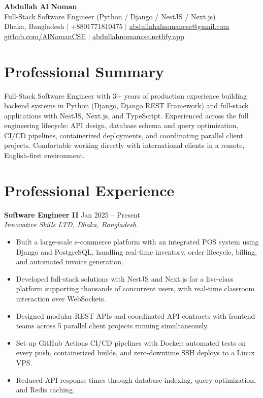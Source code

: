 \documentclass[11pt,a4paper]{article}
\newcommand{\resumeItem}[1]{\item[--] #1}
\newenvironment{resumeList}{\begin{itemize}[leftmargin=1.1em,itemsep=1pt,parsep=0pt,topsep=2pt]}{\end{itemize}}
\newcommand{\resumeEntry}[4]{
  \noindent\textbf{#1} \hfill #2 \\
  \textit{#3} \hfill \textit{#4}
}
\begin{document}
\begin{center}
    {\LARGE \textbf{Abdullah Al Noman}}\\[2pt]
    {\large Full-Stack Software Engineer (Python / Django / NestJS / Next.js)}\\[4pt]
    Dhaka, Bangladesh $\vert$ +8801771810475 $\vert$ \href{mailto:abdullahalnomancse@gmail.com}{abdullahalnomancse@gmail.com}\\
    \href{https://github.com/AlNomanCSE}{github.com/AlNomanCSE} $\vert$
    \href{https://abdullahnomancse.netlify.app}{abdullahnomancse.netlify.app}
\end{center}

\section*{Professional Summary}
Full-Stack Software Engineer with 3+ years of production experience building backend systems in Python (Django, Django REST Framework) and full-stack applications with NestJS, Next.js, and TypeScript. Experienced across the full engineering lifecycle: API design, database schema and query optimization, CI/CD pipelines, containerized deployments, and coordinating parallel client projects. Comfortable working directly with international clients in a remote, English-first environment.

\section*{Professional Experience}

\resumeEntry{Software Engineer II}{Jan 2025 -- Present}{Innovative Skills LTD, Dhaka, Bangladesh}{}
\begin{resumeList}
    \resumeItem{Built a large-scale e-commerce platform with an integrated POS system using Django and PostgreSQL, handling real-time inventory, order lifecycle, billing, and automated invoice generation.}
    \resumeItem{Developed full-stack solutions with NestJS and Next.js for a live-class platform supporting thousands of concurrent users, with real-time classroom interaction over WebSockets.}
    \resumeItem{Designed modular REST APIs and coordinated API contracts with frontend teams across 5 parallel client projects running simultaneously.}
    \resumeItem{Set up GitHub Actions CI/CD pipelines with Docker: automated tests on every push, containerized builds, and zero-downtime SSH deploys to a Linux VPS.}
    \resumeItem{Reduced API response times through database indexing, query optimization, and Redis caching.}
\end{resumeList}
\end{document}
